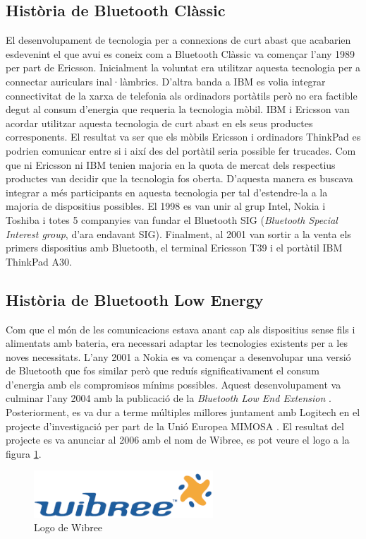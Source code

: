 \subsection{Història de Bluetooth Clàssic}
El desenvolupament de tecnologia per a connexions de curt abast que acabarien esdevenint el que avui es coneix com a Bluetooth Clàssic va començar l'any 1989 per part de Ericsson.
Inicialment la voluntat era utilitzar aquesta tecnologia per a connectar auriculars inal·làmbrics.
D'altra banda a IBM es volia integrar connectivitat de la xarxa de telefonia als ordinadors portàtils però no era factible degut al consum d'energia que requeria la tecnologia mòbil.
IBM i Ericsson van acordar utilitzar aquesta tecnologia de curt abast en els seus productes corresponents.
El resultat va ser que els mòbils Ericsson i ordinadors ThinkPad es podrien comunicar entre si i així des del portàtil seria possible fer trucades.
Com que ni Ericsson ni IBM tenien majoria en la quota de mercat dels respectius productes van decidir que la tecnologia fos oberta.
D'aquesta manera es buscava integrar a més participants en aquesta tecnologia per tal d'estendre-la a la majoria de dispositius possibles.
El 1998 es van unir al grup Intel, Nokia i Toshiba i totes 5 companyies  van fundar el Bluetooth SIG (\textit{Bluetooth Special Interest group}, d'ara endavant SIG).
Finalment, al 2001 van sortir a la venta els primers dispositius amb Bluetooth, el terminal Ericsson T39 i el portàtil IBM ThinkPad A30.

\subsection{Història de Bluetooth Low Energy}
Com que el món de les comunicacions estava anant cap als dispositius sense fils i alimentats amb bateria, era necessari adaptar les tecnologies existents per a les noves necessitats.
L'any 2001 a Nokia es va començar a desenvolupar una versió de Bluetooth que fos similar però que reduís significativament el consum d'energia amb els compromisos mínims possibles.
Aquest desenvolupament va culminar l'any 2004 amb la publicació de la \textit{Bluetooth Low End Extension} \cite{Original_BLE_Extension}. 
Posteriorment, es va dur a terme múltiples millores juntament amb Logitech en el projecte d'investigació per part de la Unió Europea MIMOSA \cite{MIMOSA}.
El resultat del projecte es va anunciar al 2006 amb el nom de Wibree, es pot veure el logo a la figura \ref{wibree_logo}.

\begin{figure}[hb]
	\begin{center}
		\includegraphics[width=0.6\textwidth]{./images/Wibree_Logo.png}
		\caption{Logo de Wibree}
		\label{wibree_logo}
	\end{center}
\end{figure}

